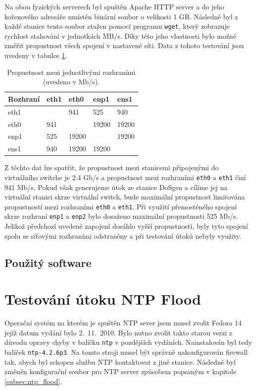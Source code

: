 Na obou fyzických serverech byl spuštěn Apache HTTP server a do jeho kořenového adresáře umístěn binární soubor o velikosti 1 GB. Následně byl z každé stanice tento soubor stažen pomocí programu \texttt{wget}, který zobrazuje rychlost stahování v jednotkách MB/s. Díky této jeho vlastnosti bylo možné změřit propustnost všech spojení v nastavené síti. Data z tohoto testování jsou uvedeny v tabulce \ref{tab:troughput-lab-interfaces}.

\begin{table}[ht]
	\centering
	\caption{Propustnost mezi jednotlivými rozhraními (uvedeno v Mb/s).}
	\label{tab:troughput-lab-interfaces}
	\begin{tabular}{|l|l|l|l|l|}
		\hline
		Rozhraní & eth1 & eth0  & enp1  & ens1  \\ \hline
		eth1     &      & 941   & 525   & 940   \\ \hline
		eth0     & 941  &       & 19200 & 19200 \\ \hline
		enp1     & 525  & 19200 &       & 19200 \\ \hline
		ens1     & 940  & 19200 & 19200 &       \\ \hline
	\end{tabular}
\end{table}

Z těchto dat lze spatřit, že propustnost mezi stanicemi připojenými do virtuálního switche je 2.4 Gb/s a propustnost mezi rozhraními \texttt{eth0} a \texttt{eth1} činí 941 Mb/s. Pokud však generujeme útok ze stanice DoSgen a cílíme jej na virtuální stanici skrze virtuální switch, bude maximální propustnost limitována propustností mezi rozhraními \texttt{eth0} a \texttt{eth1}.
Při využití přemostěného spojení skrze rozhraní \texttt{enp1} a \texttt{enp2} bylo dosaženo maximální propustnosti 525 Mb/s. Jelikož předchozí uvedené zapojení dosáhlo vyšší propustnosti, byly tyto spojení spolu se síťovými rozhraními odstraněny a při testování útoků nebyly využity.



\subsection{Použitý software} %

\newpage
\section{Testování útoku NTP Flood}
Operační systém na kterém je spuštěn NTP sever jsem musel zvolit Fedora 14 jejíž datum vydání bylo 2.\ 11.\ 2010. Bylo nutno zvolit takto starou verzi z důvodu opravy chyby v balíčku \texttt{ntp} v pozdějších vydáních. Nainstalován byl tedy balíček \texttt{ntp-4.2.6p3}. Na tomto stroji musel být správně nakonfigurován firewall tak, abych byl schopen službu NTP kontaktovat z jiné stanice. Následně byl změněn konfigurační soubor pro NTP server způsobem popsaným v kapitole \ref{subsec:ntp_flood}.

